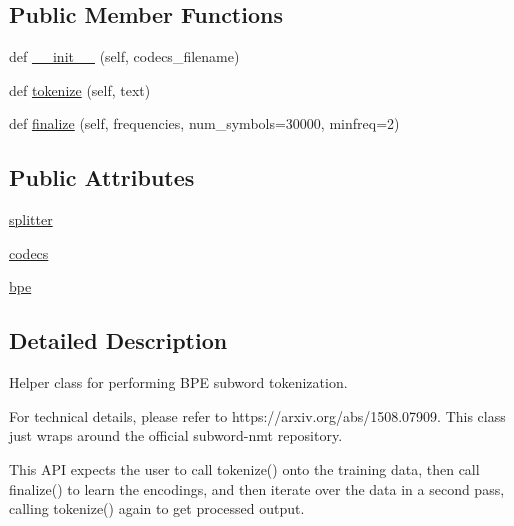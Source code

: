 \subsection*{Public Member Functions}
\begin{DoxyCompactItemize}
\item 
def \hyperlink{classparlai_1_1agents_1_1legacy__agents_1_1seq2seq_1_1dict__v1_1_1__BPEHelper_a95e6fa33247082a01355d39ee96fed39}{\+\_\+\+\_\+init\+\_\+\+\_\+} (self, codecs\+\_\+filename)
\item 
def \hyperlink{classparlai_1_1agents_1_1legacy__agents_1_1seq2seq_1_1dict__v1_1_1__BPEHelper_a4123dd721a13dc6607498ae29d7dd8a3}{tokenize} (self, text)
\item 
def \hyperlink{classparlai_1_1agents_1_1legacy__agents_1_1seq2seq_1_1dict__v1_1_1__BPEHelper_a90568a5897058075adae4b066693c0cc}{finalize} (self, frequencies, num\+\_\+symbols=30000, minfreq=2)
\end{DoxyCompactItemize}
\subsection*{Public Attributes}
\begin{DoxyCompactItemize}
\item 
\hyperlink{classparlai_1_1agents_1_1legacy__agents_1_1seq2seq_1_1dict__v1_1_1__BPEHelper_a354bb157f80cf8d87a1d0f87387f4cde}{splitter}
\item 
\hyperlink{classparlai_1_1agents_1_1legacy__agents_1_1seq2seq_1_1dict__v1_1_1__BPEHelper_a610fc5289a22d9bfe229cd090f647d43}{codecs}
\item 
\hyperlink{classparlai_1_1agents_1_1legacy__agents_1_1seq2seq_1_1dict__v1_1_1__BPEHelper_ac6a1f3216616fc9ac78a4b5501693848}{bpe}
\end{DoxyCompactItemize}


\subsection{Detailed Description}
\begin{DoxyVerb}Helper class for performing BPE subword tokenization.

For technical details, please refer to https://arxiv.org/abs/1508.07909.
This class just wraps around the official subword-nmt repository.

This API expects the user to call tokenize() onto the training data,
then call finalize() to learn the encodings, and then iterate over the data
in a second pass, calling tokenize() again to get processed output.
\end{DoxyVerb}
 

